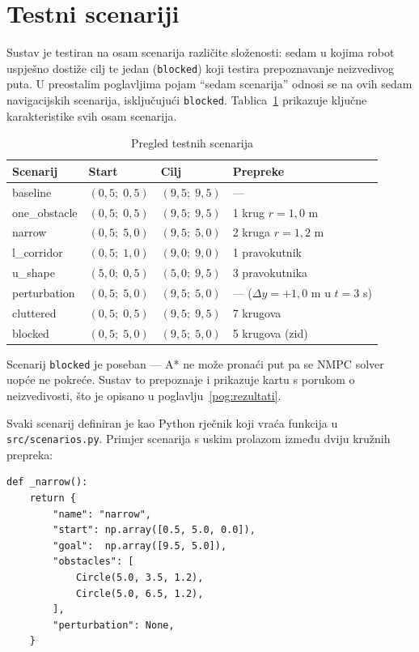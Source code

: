 \section{Testni scenariji}

Sustav je testiran na osam scenarija različite složenosti: sedam u kojima robot uspješno dostiže cilj te jedan (\texttt{blocked}) koji testira prepoznavanje neizvedivog puta. U preostalim poglavljima pojam ``sedam scenarija'' odnosi se na ovih sedam navigacijskih scenarija, isključujući \texttt{blocked}. Tablica~\ref{tab:scenariji} prikazuje ključne karakteristike svih osam scenarija.

\begin{table}[H]
\centering
\caption{Pregled testnih scenarija}
\label{tab:scenariji}
\begin{tabular}{llll}
\toprule
Scenarij & Start & Cilj & Prepreke \\
\midrule
baseline     & $(0{,}5;\; 0{,}5)$ & $(9{,}5;\; 9{,}5)$ & — \\
one\_obstacle & $(0{,}5;\; 0{,}5)$ & $(9{,}5;\; 9{,}5)$ & 1 krug $r=1{,}0$ m \\
narrow       & $(0{,}5;\; 5{,}0)$ & $(9{,}5;\; 5{,}0)$ & 2 kruga $r=1{,}2$ m \\
l\_corridor  & $(0{,}5;\; 1{,}0)$ & $(9{,}0;\; 9{,}0)$ & 1 pravokutnik \\
u\_shape     & $(5{,}0;\; 0{,}5)$ & $(5{,}0;\; 9{,}5)$ & 3 pravokutnika \\
perturbation & $(0{,}5;\; 5{,}0)$ & $(9{,}5;\; 5{,}0)$ & — ($\Delta y = +1{,}0$ m u $t=3$ s) \\
cluttered    & $(0{,}5;\; 0{,}5)$ & $(9{,}5;\; 9{,}5)$ & 7 krugova \\
blocked      & $(0{,}5;\; 5{,}0)$ & $(9{,}5;\; 5{,}0)$ & 5 krugova (zid) \\
\bottomrule
\end{tabular}
\end{table}

Scenarij \texttt{blocked} je poseban --- A* ne može pronaći put pa se NMPC solver uopće ne pokreće. Sustav to prepoznaje i prikazuje kartu s porukom o neizvedivosti, što je opisano u poglavlju~\ref{pog:rezultati}.

Svaki scenarij definiran je kao Python rječnik koji vraća funkcija u \texttt{src/scenarios.py}. Primjer scenarija s uskim prolazom između dviju kružnih prepreka:

\begin{listing}[H]
\begin{verbatim}
def _narrow():
    return {
        "name": "narrow",
        "start": np.array([0.5, 5.0, 0.0]),
        "goal":  np.array([9.5, 5.0]),
        "obstacles": [
            Circle(5.0, 3.5, 1.2),
            Circle(5.0, 6.5, 1.2),
        ],
        "perturbation": None,
    }
\end{verbatim}
\caption{Definicija scenarija uskog prolaza u \texttt{src/scenarios.py}. Prepreke su instance klase \texttt{Circle(cx, cy, r)}; svi scenariji bez poremećaja imaju \texttt{perturbation: None}.}
\end{listing}
